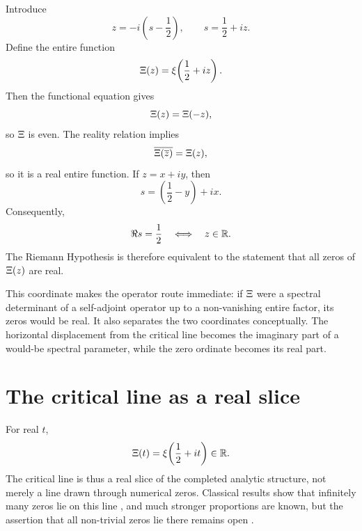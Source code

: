 Introduce
\begin{equation}
 z=-i\left(s-\frac12\right),
 \qquad s=\frac12+iz.
 \label{eq:centered-coordinate}
\end{equation}
Define the entire function
\begin{equation}
 \Xi(z)=\xi\!\left(\frac12+iz\right).
 \label{eq:Xi-def}
\end{equation}
Then the functional equation gives
\[
 \Xi(z)=\Xi(-z),
\]
so $\Xi$ is even. The reality relation implies
\[
 \overline{\Xi(\overline{z})}=\Xi(z),
\]
so it is a real entire function. If $z=x+iy$, then
\[
 s=\left(\frac12-y\right)+ix.
\]
Consequently,
\begin{equation}
 \Re s=\frac12\quad\Longleftrightarrow\quad z\in\mathbb{R}.
 \label{eq:rh-real-xi-zeros}
\end{equation}
The Riemann Hypothesis is therefore equivalent to the statement that all zeros of $\Xi(z)$ are real.

This coordinate makes the operator route immediate: if $\Xi$ were a spectral determinant of a self-adjoint operator up to a non-vanishing entire factor, its zeros would be real. It also separates the two coordinates conceptually. The horizontal displacement from the critical line becomes the imaginary part of a would-be spectral parameter, while the zero ordinate becomes its real part.

\section{The critical line as a real slice}

For real $t$,
\[
 \Xi(t)=\xi\!\left(\frac12+it\right)\in\mathbb{R}.
\]
The critical line is thus a real slice of the completed analytic structure, not merely a line drawn through numerical zeros. Classical results show that infinitely many zeros lie on this line \citep{hardy1914}, and much stronger proportions are known, but the assertion that all non-trivial zeros lie there remains open \citep{conrey2003,clay2026}.


